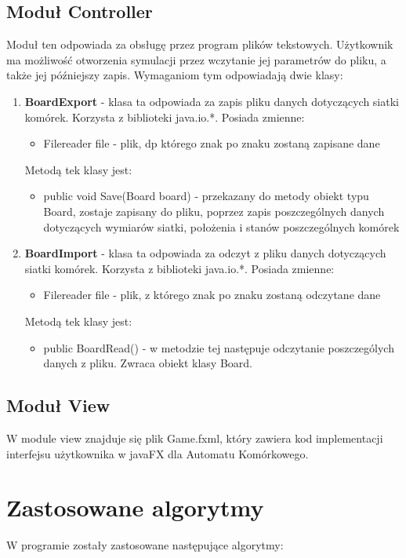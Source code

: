 \documentclass[10pt, oneside]{article}
\begin{document}
\subsection{Moduł Controller}
Moduł ten odpowiada za obsługę przez program plików tekstowych. Użytkownik ma możliwość otworzenia symulacji przez wczytanie jej parametrów do pliku, a także jej późniejszy zapis. Wymaganiom tym odpowiadają dwie klasy:
\begin {enumerate}
\item \textbf{BoardExport} - klasa ta odpowiada za zapis pliku danych dotyczących siatki komórek. Korzysta z biblioteki java.io.*.  Posiada zmienne:
\begin{itemize}
\item Filereader file - plik, dp którego znak po znaku zostaną zapisane dane
\end{itemize}
Metodą tek klasy jest:
\begin{itemize}
\item public void Save(Board board) - przekazany do metody obiekt typu Board, zostaje zapisany do pliku, poprzez zapis poszczególnych danych dotyczących wymiarów siatki, położenia i stanów poszczególnych komórek
\end{itemize}


\item \textbf{BoardImport} - klasa ta odpowiada za odczyt z pliku danych dotyczących siatki komórek. Korzysta z biblioteki java.io.*.  Posiada zmienne:
\begin{itemize}
\item Filereader file - plik, z którego znak po znaku zostaną odczytane dane
\end{itemize}
Metodą tek klasy jest:
\begin{itemize}
\item public BoardRead() - w metodzie tej następuje odczytanie poszczególych danych z pliku. Zwraca obiekt klasy Board.
\end{itemize}
\end{enumerate}

\subsection{Moduł View}
W module view znajduje się plik Game.fxml, który zawiera kod implementacji interfejsu użytkownika w javaFX dla Automatu Komórkowego.

\section{Zastosowane algorytmy}
W programie zostały zastosowane następujące algorytmy:
\end{document}
